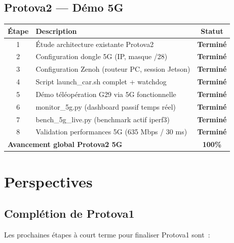 \documentclass[a4paper,11pt]{article}
\begin{document}
\subsection{Protova2 — Démo 5G}

\begin{center}
\begin{tabularx}{\textwidth}{@{}cXc@{}}
\toprule
\textbf{Étape} & \textbf{Description} & \textbf{Statut} \\
\midrule
1 & Étude architecture existante Protova2 & \textcolor{success}{\textbf{Terminé}} \\
2 & Configuration dongle 5G (IP, masque /28) & \textcolor{success}{\textbf{Terminé}} \\
3 & Configuration Zenoh (routeur PC, session Jetson) & \textcolor{success}{\textbf{Terminé}} \\
4 & Script launch\_car.sh complet + watchdog & \textcolor{success}{\textbf{Terminé}} \\
5 & Démo téléopération G29 via 5G fonctionnelle & \textcolor{success}{\textbf{Terminé}} \\
6 & monitor\_5g.py (dashboard passif temps réel) & \textcolor{success}{\textbf{Terminé}} \\
7 & bench\_5g\_live.py (benchmark actif iperf3) & \textcolor{success}{\textbf{Terminé}} \\
8 & Validation performances 5G (635 Mbps / 30 ms) & \textcolor{success}{\textbf{Terminé}} \\
\midrule
\multicolumn{2}{l}{\textbf{Avancement global Protova2 5G}} & \textbf{100\%} \\
\bottomrule
\end{tabularx}
\end{center}


\newpage
\section{Perspectives}

\subsection{Complétion de Protova1}

Les prochaines étapes à court terme pour finaliser Protova1 sont~:
\end{document}
